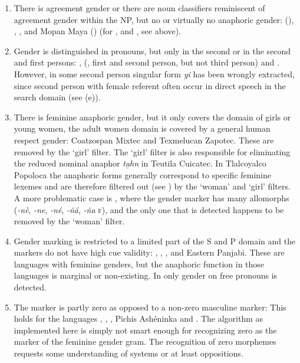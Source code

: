 \documentclass[output=collectionpaper]{langsci/langscibook}
\begin{document}
\begin{enumerate}[label=(\alph*)]
\item
There is agreement gender or there are noun classifiers reminiscent of agreement gender within the NP, but no or virtually no anaphoric gender:  (\citealt[21]{Driem1987}), , , and Mopan Maya (\citealt{Contini-Morava2018}) (for ,  and , see  above).
\item
Gender is distinguished in pronouns, but only in the second or in the second and first persons: ,  (\citealt[136]{Jung2008}, first and second person, but not third person) and . However, in  some second person singular form \textit{yi} has been wrongly extracted, since second person with female referent often occur in direct speech in the search domain (see  (e)).
\item
There is feminine anaphoric gender, but it only covers the domain of girls or young women, the adult women domain is covered by a general human respect gender: Coatzospan Mixtec and Texmelucan Zapotec. These are removed by the ‘girl’ filter. The ‘girl’ filter is also responsible for eliminating the reduced nominal anaphor \textit{ta̱hn} in Teutila Cuicatec. In Tlalcoyalco Popoloca the anaphoric forms generally correspond to specific feminine lexemes and are therefore filtered out (see ) by the ‘woman’ and ‘girl’ filters. A more problematic case is  , where the gender marker has many allomorphs (\textit{-nè}, \textit{-ne},  \textit{-né}, \textit{-ñá}, \textit{-ña} \textsc{f}), and the only one that is detected happens to be removed by the ‘woman’ filter.
\item
Gender marking is restricted to a limited part of the S and P domain and the markers do not have high cue validity: , , , and Eastern Panjabi. These are languages with feminine genders, but the anaphoric function in those languages is marginal or non-existing. In  only gender on free pronouns is detected.
\item
The marker is partly zero as opposed to a non-zero masculine marker: This holds for the  languages , , , Pichis Ashéninka and . The algorithm as implemented here is simply not smart enough for recognizing zero as the marker of the feminine gender gram. The recognition of zero morphemes requests some understanding of systems or at least oppositions.

\end{enumerate}
\end{document}
